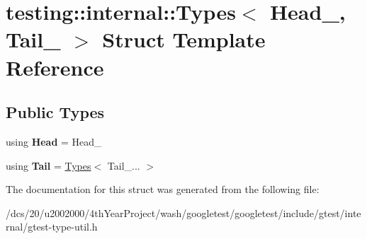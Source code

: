 \hypertarget{structtesting_1_1internal_1_1Types}{}\section{testing\+:\+:internal\+:\+:Types$<$ Head\+\_\+, Tail\+\_\+ $>$ Struct Template Reference}
\label{structtesting_1_1internal_1_1Types}
\subsection*{Public Types}
\begin{DoxyCompactItemize}
\item 
\mbox{\label{structtesting_1_1internal_1_1Types_af25c9ea6cd38071ce5154f3869fc0cc0}} 
using {\bfseries Head} = Head\+\_\+
\item 
\mbox{\label{structtesting_1_1internal_1_1Types_a95f833deba9a29970bb310b80f97239f}} 
using {\bfseries Tail} = \mbox{\hyperlink{structtesting_1_1internal_1_1Types}{Types}}$<$ Tail\+\_\+... $>$
\end{DoxyCompactItemize}


The documentation for this struct was generated from the following file\+:\begin{DoxyCompactItemize}
\item 
/dcs/20/u2002000/4th\+Year\+Project/wash/googletest/googletest/include/gtest/internal/gtest-\/type-\/util.\+h\end{DoxyCompactItemize}
